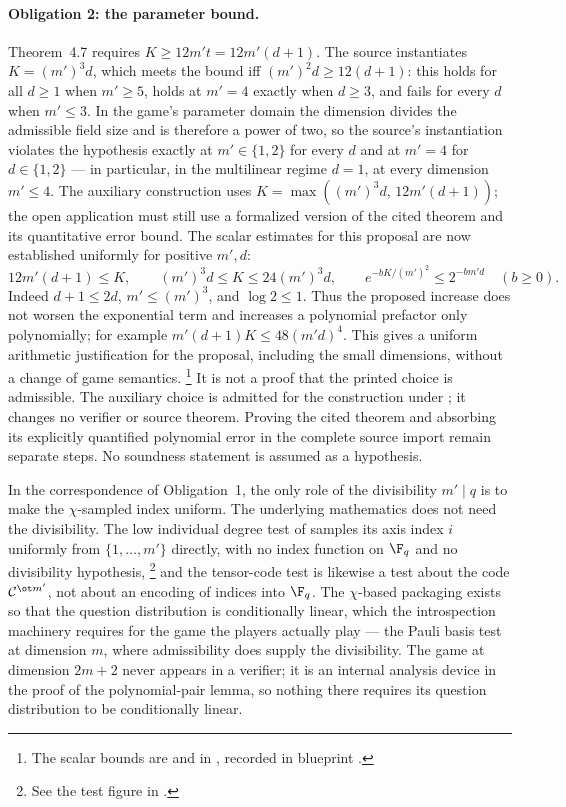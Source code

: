 \documentclass[11pt]{article}
\begin{document}
\paragraph{Obligation 2: the parameter bound.}
Theorem~4.7 requires $K \ge 12 m' t = 12 m' (d+1)$.  The source
instantiates $K = (m')^3 d$, which meets the bound iff
$(m')^2 d \ge 12(d+1)$: this holds for all $d \ge 1$ when $m' \ge 5$,
holds at $m' = 4$ exactly when $d \ge 3$, and fails for every $d$ when
$m' \le 3$.  In the game's parameter domain the dimension divides the
admissible field size and is therefore a power of two, so the source's
instantiation violates the hypothesis exactly at $m' \in \{1,2\}$ for
every $d$ and at $m' = 4$ for $d \in \{1,2\}$ --- in particular, in the
multilinear regime $d = 1$, at every dimension $m' \le 4$. The auxiliary
construction uses $K = \max((m')^3 d,\, 12 m'(d+1))$; the open
application must still use a formalized version of the cited theorem and
its quantitative error bound. The scalar estimates for this proposal are
now established uniformly for positive $m',d$:
\[
  12m'(d+1)\le K,\qquad (m')^3d\le K\le24(m')^3d,
  \qquad e^{-bK/(m')^2}\le2^{-bm'd}\quad(b\ge0).
\]
Indeed $d+1\le2d$, $m'\le(m')^3$, and $\log 2\le1$. Thus the
proposed increase does not worsen the exponential term and increases a
polynomial prefactor only polynomially; for example
$m'(d+1)K\le48(m'd)^4$. This gives a uniform arithmetic justification
for the proposal, including the small dimensions, without a change of
game semantics.%
\footnote{The scalar bounds are  and
 in
, recorded in
blueprint .}
It is not a proof that the printed choice is admissible. The auxiliary choice
is admitted for the construction under ; it changes no verifier
or source theorem. Proving the cited theorem and absorbing its explicitly
quantified polynomial error in the complete source import remain separate
steps. No soundness statement is assumed as a hypothesis.

In the correspondence of Obligation~1, the only role of the divisibility
$m' \mid q$ is to make the $\chi$-sampled index uniform.  The underlying
mathematics does not need the divisibility.  The low
individual degree test of \cite{Ji2020LowIndividualDegree} samples its axis
index $i$ uniformly from $\{1,\ldots,m'\}$ directly, with no index function
on $\F_q$ and no divisibility hypothesis,%
\footnote{See the test figure in .}
and the tensor-code test is likewise a test about the code
$\mathcal C^{\ot m'}$, not about an encoding of indices into $\F_q$.  The
$\chi$-based packaging exists so that the question distribution is
conditionally linear, which the introspection machinery requires for the
game the players actually play --- the Pauli basis test at dimension $m$,
where admissibility does supply the divisibility.  The game at dimension
$2m+2$ never appears in a verifier; it is an internal analysis device in the
proof of the polynomial-pair lemma, so nothing there requires its question
distribution to be conditionally linear.
\end{document}
